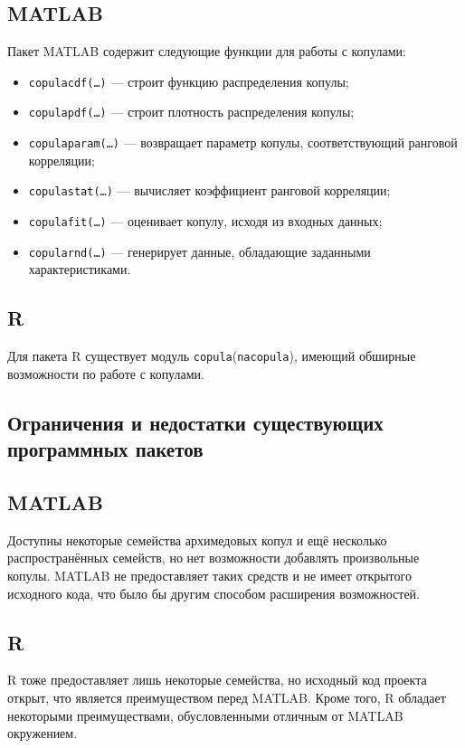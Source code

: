 \subsection*{MATLAB}
Пакет MATLAB содержит следующие функции для работы с копулами:
\begin{itemize}
	\item \texttt{copulacdf(\ldots)} --- строит функцию распределения копулы;
	\item \texttt{copulapdf(\ldots)} --- строит плотность распределения копулы;
	\item \texttt{copulaparam(\ldots)} --- возвращает параметр копулы, соответствующий ранговой корреляции;
	\item \texttt{copulastat(\ldots)} --- вычисляет коэффициент ранговой корреляции;
	\item \texttt{copulafit(\ldots)} --- оценивает копулу, исходя из входных данных;
	\item \texttt{copularnd(\ldots)} --- генерирует данные, обладающие заданными характеристиками.
\end{itemize}

\subsection*{R}
Для пакета R существует модуль \texttt{copula}(\texttt{nacopula}), имеющий обширные возможности \cite{Rcopula} по работе с копулами.

\subsection*{Ограничения и недостатки существующих программных пакетов}
\subsection*{MATLAB}
Доступны некоторые семейства архимедовых копул и ещё несколько распространённых семейств, но нет возможности добавлять произвольные копулы. MATLAB не предоставляет таких средств и не имеет открытого исходного кода, что было бы другим способом расширения возможностей.

\subsection*{R}
R тоже предоставляет лишь некоторые семейства, но исходный код проекта открыт, что является преимуществом перед MATLAB. Кроме того, R обладает некоторыми преимуществами, обусловленными отличным от MATLAB окружением.
\clearpage
